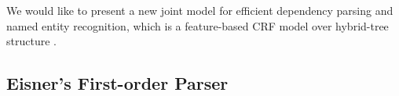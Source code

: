 We would like to present a new joint model for efficient dependency parsing and named entity recognition, which is a feature-based CRF model over hybrid-tree structure \cite{lu2008generative,klein2004parsing}. 
  
\subsection{Eisner's First-order Parser}

